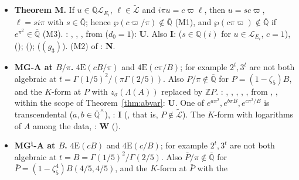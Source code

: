\documentclass[11pt]{amsart}
\theoremstyle{definition}
\theoremstyle{remark}
\numberwithin{equation}{section}
\newcommand{\ZZ}{\mathbb{Z}}
\newcommand{\QQ}{\mathbb{Q}}
\newcommand{\Qbar}{\overline{\mathbb{Q}}}
\newcommand{\vp}{\varpi}
\begin{document}
\begin{itemize}
\cite{Note}; the step to Theorem~MX$'$ of \cite{MstarPaper} is \textbf{N}). (deg2)(i) $\pi,\vp,\Omega_\rho,\vp\Omega_\rho$ are
$\Qbar$-linearly independent; (ii) so are $1,\vp,\Omega_\rho,\vp\Omega_\rho/\pi$. , all \textbf{I}, all with
$(g_3)$, $(\Gamma)$: ;  (also ,  \cite{Masser1975}); , its
corollary on $\zeta$ (also  \cite{Laurent1980}); ; ,  (also
, which implies $(\Gamma)$). From  ($r=1$) and
 ($r=2$). These statements use hand-written quasi-periods and the coordinates ,
checked numerically in the certificate's reviews.
\item \textbf{Theorem M.} If $u\in\Qbar\mathcal L_{E_i}$, $\ell\in\widetilde{\mathcal L}$ and $i\pi u=c\vp\ell$, then $u=sc\vp$,
$\ell=si\pi$ with $s\in\Qbar$; hence $\wp(c\vp/\pi)\notin\Qbar$ (M1), and $\wp(c\pi\vp)\notin\Qbar$ if $e^{\pi^2}\in\Qbar$ (M3).
: , , , from  ($d_0=1$): \textbf{U}.
Also \textbf{I}:  ($s\in\QQ(i)$ for $u\in\mathcal L_{E_i}$, $c=1$),  ();
 ();  ($(g_3)$). (M2) of \cite{Note}: \textbf{N}.
\item \textbf{MG-A at $B/\pi$.} $\mathrm{4E}(cB/\pi)$ and $\mathrm{4E}(c\pi/B)$; for example $2^t,3^t$ are not both algebraic at
$t=\Gamma(1/5)^2/(\pi\Gamma(2/5))$. Also $P/\pi\notin\Qbar$ for $P=(1-\zeta_5)B$, and the $K$-form at $P$ with $z_\sigma(\Lambda(A))$
replaced by $\ZZ P$. : , ,
, , , from ,
, within the scope of Theorem~\ref{thm:abvar}: \textbf{U}. One of $e^{a\pi^2},e^{b\pi B},e^{c\pi^2/B}$
is transcendental ($a,b\in\Qbar^\times$), : \textbf{I} (, that is,
$P\notin\widetilde{\mathcal L}$). The $K$-form with logarithms of $A$ among the data, : \textbf{W}
().
\item \textbf{MG$^\natural$-A at $B$.} $\mathrm{4E}(cB)$ and $\mathrm{4E}(c/B)$; for example $2^t,3^t$ are not both algebraic at
$t=B=\Gamma(1/5)^2/\Gamma(2/5)$. Also $\bar P/\pi\notin\Qbar$ for $\bar P=(1-\zeta_5^4)B(4/5,4/5)$, and the $K$-form at $\bar P$ with the

\end{itemize}
\end{document}
